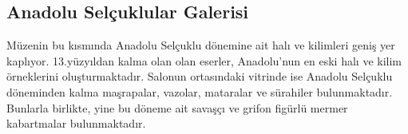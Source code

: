 \subsection{Anadolu Selçuklular Galerisi}
\indent\indent Müzenin bu kısmında Anadolu Selçuklu dönemine ait halı ve kilimleri geniş yer kaplıyor. 13.yüzyıldan kalma olan olan eserler, Anadolu'nun en eski halı ve kilim örneklerini oluşturmaktadır. Salonun ortasındaki vitrinde ise Anadolu Selçuklu döneminden kalma maşrapalar, vazolar, mataralar ve sürahiler bulunmaktadır. Bunlarla birlikte, yine bu döneme ait savaşçı ve grifon figürlü mermer kabartmalar bulunmaktadır.\newline
\begin{figure}[H]
    \centering
    \hspace{10pt}
\end{figure}
